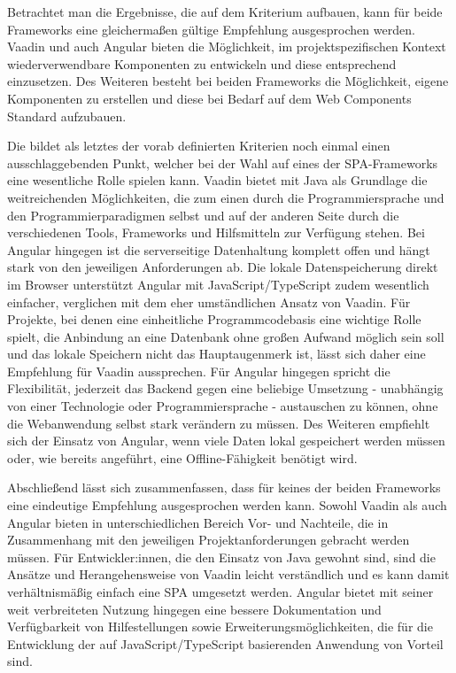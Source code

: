 \documentclass[a4paper,12pt,twoside]{scrreprt}
\begin{document}
\medskip

Betrachtet man die Ergebnisse, die auf dem Kriterium \textit{} aufbauen, kann für beide Frameworks eine gleichermaßen gültige Empfehlung ausgesprochen werden. Vaadin und auch Angular bieten die Möglichkeit, im projektspezifischen Kontext wiederverwendbare Komponenten zu entwickeln und diese entsprechend einzusetzen. Des Weiteren besteht bei beiden Frameworks die Möglichkeit, eigene Komponenten zu erstellen und diese bei Bedarf auf dem Web Components Standard aufzubauen.

\medskip

Die \textit{} bildet als letztes der vorab definierten Kriterien noch einmal einen ausschlaggebenden Punkt, welcher bei der Wahl auf eines der \ac{SPA}-Frameworks eine wesentliche Rolle spielen kann. Vaadin bietet mit Java als Grundlage die weitreichenden Möglichkeiten, die zum einen durch die Programmiersprache und den Programmierparadigmen selbst und auf der anderen Seite durch die verschiedenen Tools, Frameworks und Hilfsmitteln zur Verfügung stehen. Bei Angular hingegen ist die serverseitige Datenhaltung komplett offen und hängt stark von den jeweiligen Anforderungen ab. Die lokale Datenspeicherung direkt im Browser unterstützt Angular mit JavaScript/TypeScript zudem wesentlich einfacher, verglichen mit dem eher umständlichen Ansatz von Vaadin. Für Projekte, bei denen eine einheitliche Programmcodebasis eine wichtige Rolle spielt, die Anbindung an eine Datenbank ohne großen Aufwand möglich sein soll und das lokale Speichern nicht das Hauptaugenmerk ist, lässt sich daher eine Empfehlung für Vaadin aussprechen. Für Angular hingegen spricht die Flexibilität, jederzeit das Backend gegen eine beliebige Umsetzung - unabhängig von einer Technologie oder Programmiersprache - austauschen zu können, ohne die Webanwendung selbst stark verändern zu müssen. Des Weiteren empfiehlt sich der Einsatz von Angular, wenn viele Daten lokal gespeichert werden müssen oder, wie bereits angeführt, eine Offline-Fähigkeit benötigt wird.

\clearpage

Abschließend lässt sich zusammenfassen, dass für keines der beiden Frameworks eine eindeutige Empfehlung ausgesprochen werden kann. Sowohl Vaadin als auch Angular bieten in unterschiedlichen Bereich Vor- und Nachteile, die in Zusammenhang mit den jeweiligen Projektanforderungen gebracht werden müssen. Für Entwickler:innen, die den Einsatz von Java gewohnt sind, sind die Ansätze und Herangehensweise von Vaadin leicht verständlich und es kann damit verhältnismäßig einfach eine \ac{SPA} umgesetzt werden. Angular bietet mit seiner weit verbreiteten Nutzung hingegen eine bessere Dokumentation und Verfügbarkeit von Hilfestellungen sowie Erweiterungsmöglichkeiten, die für die Entwicklung der auf JavaScript/TypeScript basierenden Anwendung von Vorteil sind.
\end{document}
